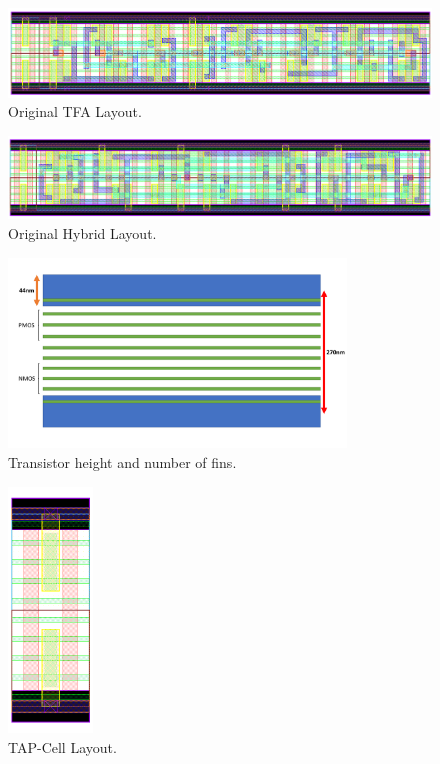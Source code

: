 \documentclass[ecp,tc, english]{iiufrgs}
\begin{document}
\begin{figure}[H]
\centering
\includegraphics[width=\textwidth]{TFA.png}
\caption{Original TFA Layout.}
\label{fig:TFA}
\end{figure}

\begin{figure}[H]
\centering
\includegraphics[width=\textwidth]{HYBRID.png}
\caption{Original Hybrid Layout.}
\label{fig:HYBRID}
\end{figure}

\begin{figure}[H]
\centering
\includegraphics[width=0.8\textwidth]{transistorHeight.pdf}
\caption{Transistor height and number of fins.}
\label{th}
\end{figure}

\begin{figure}[H]
\centering
\includegraphics[width=0.2\textwidth]{TAP.png}
\caption{TAP-Cell Layout.}
\label{tap}
\end{figure}
\end{document}

